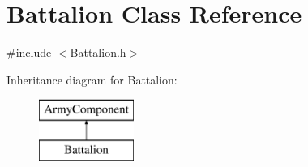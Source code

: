 \hypertarget{class_battalion}{}\section{Battalion Class Reference}
\label{class_battalion}


{\ttfamily \#include $<$Battalion.\+h$>$}

Inheritance diagram for Battalion\+:\begin{figure}[H]
\begin{center}
\leavevmode
\includegraphics[height=2.000000cm]{class_battalion}
\end{center}
\end{figure}
